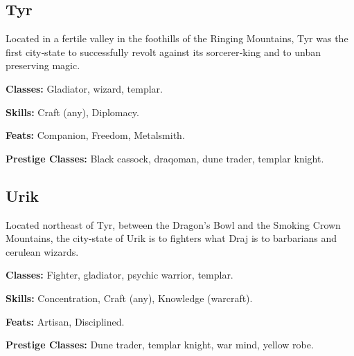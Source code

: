 \subsection{Tyr}
Located in a fertile valley in the foothills of the Ringing Mountains, Tyr was the first city‐state to successfully revolt against its sorcerer‐king and to unban preserving magic.

\textbf{Classes:} Gladiator, wizard, templar.

\textbf{Skills:} Craft (any), Diplomacy.

\textbf{Feats:} Companion, Freedom, Metalsmith.

\textbf{Prestige Classes:} Black cassock, draqoman, dune trader, templar knight.

\subsection{Urik}
Located northeast of Tyr, between the Dragon's Bowl and the Smoking Crown Mountains, the city‐state of Urik is to fighters what Draj is to barbarians and cerulean wizards.

\textbf{Classes:} Fighter, gladiator, psychic warrior, templar.

\textbf{Skills:} Concentration, Craft (any), Knowledge (warcraft).

\textbf{Feats:} Artisan, Disciplined.

\textbf{Prestige Classes:} Dune trader, templar knight, war mind, yellow robe.
